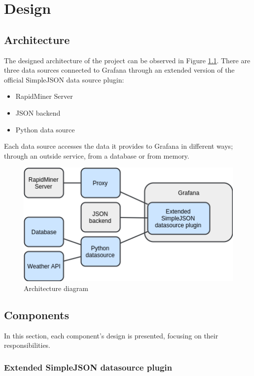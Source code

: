 \chapter{Design}

\section{Architecture} \label{arch-design}

The designed architecture of the project can be observed in Figure \ref{fig:arch}. There are three data sources connected to Grafana through an extended version of the official SimpleJSON data source plugin:

\begin{itemize}
	\item RapidMiner Server
	\item JSON backend
	\item Python data source
\end{itemize}

Each data source accesses the data it provides to Grafana in different ways; through an outside service, from a database or from memory.

\begin{figure}[H]
	\centering
	\includegraphics[width=130mm, keepaspectratio]{figures/architecture.png}
	\caption{Architecture diagram}
	\label{fig:arch}
\end{figure}

\section{Components}

In this section, each component's design is presented, focusing on their responsibilities.

\subsection{Extended SimpleJSON datasource plugin} \label{simplejson-design}

